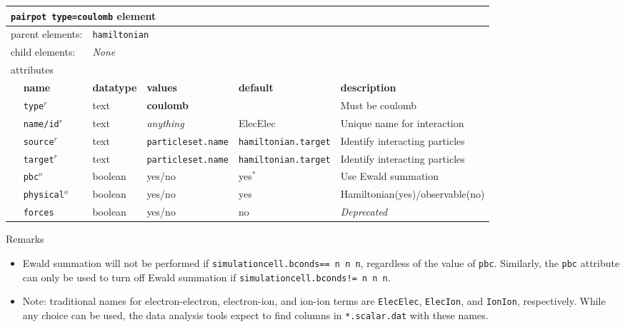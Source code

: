 \FloatBarrier
\begin{table}[h]
\begin{center}
\begin{tabularx}{\textwidth}{l l l l l l }
\hline
\multicolumn{6}{l}{\texttt{pairpot type=coulomb} element} \\
\hline
\multicolumn{2}{l}{parent elements:} & \multicolumn{4}{l}{\texttt{hamiltonian}}\\
\multicolumn{2}{l}{child  elements:} & \multicolumn{4}{l}{\textit{None}}\\
\multicolumn{2}{l}{attributes}  & \multicolumn{4}{l}{}\\
   &   \bfseries name     & \bfseries datatype & \bfseries values & \bfseries default   & \bfseries description \\
   & \texttt{type}$^r$    &  text              & \textbf{coulomb} &                     & Must be coulomb     \\
   & \texttt{name/id}$^r$ &  text              & \textit{anything}&  ElecElec           & Unique name for interaction\\
   & \texttt{source}$^r$  &  text              & \texttt{particleset.name} &\texttt{hamiltonian.target}& Identify interacting particles\\
   & \texttt{target}$^r$  &  text              & \texttt{particleset.name} &\texttt{hamiltonian.target}& Identify interacting particles\\
   & \texttt{pbc}$^o$     &  boolean           & yes/no           & yes$^*$             & Use Ewald summation  \\
   & \texttt{physical}$^o$&  boolean           & yes/no           & yes                 & Hamiltonian(yes)/observable(no) \\
   & \texttt{forces}      &  boolean           & yes/no           & no                  & \textit{Deprecated}             \\
  \hline
\end{tabularx}
\end{center}
\end{table}
\FloatBarrier

Remarks
\begin{itemize}
  \item{Ewald summation will not be performed if \texttt{simulationcell.bconds== n n n}, regardless of the value of \texttt{pbc}.  Similarly, the \texttt{pbc} attribute can only be used to turn off Ewald summation if \texttt{simulationcell.bconds!= n n n}.}
  \item{Note: traditional names for electron-electron, electron-ion, and ion-ion terms are \texttt{ElecElec}, \texttt{ElecIon}, and \texttt{IonIon}, respectively.  While any choice can be used, the data analysis tools expect to find columns in \texttt{*.scalar.dat} with these names.}
\end{itemize}


